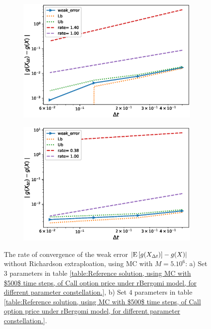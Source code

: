 \begin{figure}[!htb]
	\centering
	\begin{subfigure}{.4\textwidth}
		\centering
		\includegraphics[width=1\linewidth]{./figures/rBergomi_weak_error_rates/without_richardson/H_002/weak_convergence_order_Bergomi_H_002_K_1_M_3_10_6_CI_relative}
		\caption{}
		\label{fig:sub3}
	\end{subfigure}%
	\begin{subfigure}{.4\textwidth}
		\centering
		\includegraphics[width=1\linewidth]{./figures/rBergomi_weak_error_rates/without_richardson/H_002/weak_convergence_order_Bergomi_H_002_K_08_M_5_10_6_CI_relative}
		\caption{}
		\label{fig:sub4}
	\end{subfigure}
	
	\caption{The rate of convergence of the weak error $\left\lvert\mathrm{E}\left[g(X_{\Delta t})\right]-g(X)\right\rvert$  without Richardson extraploation, using MC with $M=5.10^6$: a) Set $3$ parameters in table \ref{table:Reference solution, using MC with $500$ time steps, of Call option price under rBergomi model, for different parameter constellation.},  b) Set $4$ parameters in table \ref{table:Reference solution, using MC with $500$ time steps, of Call option price under rBergomi model, for different parameter constellation.}. }
	\label{fig:Weak_rate_H_002_without_rich_K_1_K_08}
\end{figure}











